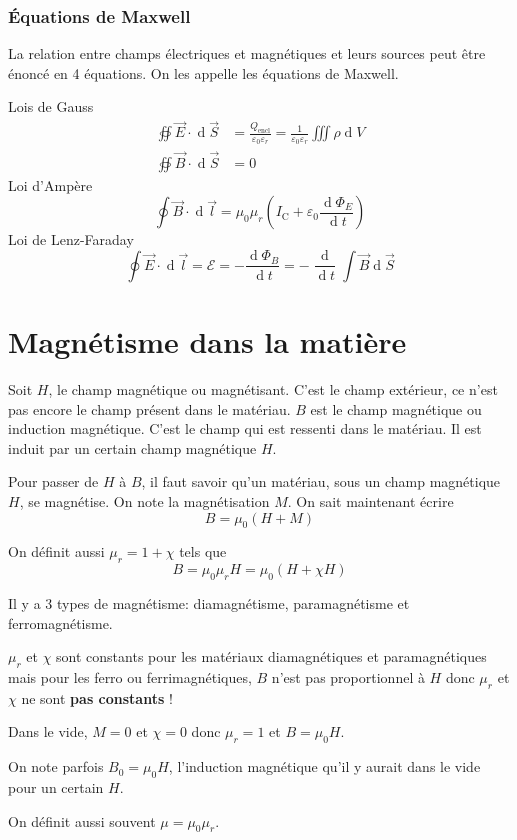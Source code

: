 \documentclass[11pt,a4paper]{article}
\newcommand{\B}{\vec B}
\newcommand{\E}{\vec E}
\newcommand{\EMF}{\mathcal{E}}
\DeclareMathOperator{\diff}{d}
\newcommand{\dif}{\diff\!}
\begin{document}
\section{Équations de Maxwell}
La relation entre champs électriques et magnétiques et leurs sources peut être énoncé en 4 équations.
On les appelle les équations de Maxwell.

Lois de Gauss
\begin{align*}
	\oiint \E \cdot \dif \vec S &= \frac{Q_\mathrm{encl}}{\varepsilon_0\varepsilon_r} = \frac{1}{\varepsilon_0\varepsilon_r}\iiint \rho \dif V\\
	\oiint \B \cdot \dif \vec S &= 0
\end{align*}
Loi d'Ampère
\[ \oint \B \cdot \dif \vec l = \mu_0\mu_r \left(I_\mathrm{C} + \varepsilon_0 \frac{\dif \Phi_E}{\dif t}\right) \]%
Loi de Lenz-Faraday
\[ \oint \E \cdot \dif \vec l = \EMF = - \frac{\dif \Phi_B}{\dif t} = - \frac{\dif}{\dif t}\int \B \dif \vec S \]

\part{Magnétisme dans la matière}
Soit $H$, le champ magnétique ou magnétisant.
C'est le champ extérieur, ce n'est pas encore le champ présent dans le matériau.
$B$ est le champ magnétique ou induction magnétique.
C'est le champ qui est ressenti dans le matériau.
Il est induit par un certain champ magnétique $H$.

Pour passer de $H$ à $B$, il faut savoir qu'un matériau, sous un champ magnétique $H$, se magnétise.
On note la magnétisation $M$.
On sait maintenant écrire
\[ B = \mu_0 (H + M) \]

On définit aussi $\mu_r = 1 + \chi$ tels que
\[ B = \mu_0\mu_r H = \mu_0 (H + \chi H) \]

Il y a 3 types de magnétisme: diamagnétisme, paramagnétisme et ferromagnétisme.

$\mu_r$ et $\chi$ sont constants pour les matériaux diamagnétiques et paramagnétiques mais pour les ferro ou ferrimagnétiques, $B$ n'est pas proportionnel à $H$ donc $\mu_r$ et $\chi$ ne sont \textbf{pas constants} !

Dans le vide, $M = 0$ et $\chi = 0$ donc $\mu_r = 1$ et $B = \mu_0 H$.

On note parfois $B_0 = \mu_0 H$, l'induction magnétique qu'il y aurait dans le vide pour un certain $H$.

On définit aussi souvent $\mu = \mu_0 \mu_r$.
\end{document}
